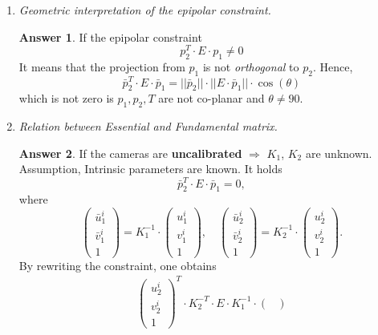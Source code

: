 \documentclass[a4paper,12 pt]{article}
\theoremstyle{definition}
\theoremstyle{remark}
\theoremstyle{definition}
\theoremstyle{definition}
\theoremstyle{definition}
\theoremstyle{definition}
\theoremstyle{remark}
\theoremstyle{remark}
\theoremstyle{definition}
\theoremstyle{definition}
\newtheorem*{answer}{Answer}
\begin{document}
\begin{enumerate}
\item \textit{Geometric interpretation of the epipolar constraint.}
\begin{answer}
If the epipolar constraint
\begin{equation}
p_2^T \cdot E \cdot p_1\neq 0 
\end{equation}
It means that the projection from $p_1$ is not \textit{orthogonal} to $p_2  $. Hence,
\begin{equation}
\bar{p}_2^T\cdot E \cdot \bar{p}_1 = ||\bar{p}_2||\cdot ||E\cdot \bar{p}_1||\cdot \cos(\theta)
\end{equation}
which is not zero is $p_1,p_2,T$ are not co-planar and $\theta\neq 90$. 
\end{answer}
\item \textit{Relation between Essential and Fundamental matrix. }
\begin{answer}
If the cameras are \textbf{uncalibrated} $\Rightarrow$ $K_1$, $K_2$ are unknown.\\
Assumption, Intrinsic parameters are known. It holds 
\begin{equation}
\bar{p}_2^T\cdot E \cdot \bar{p}_1=0,
\end{equation}
where 
\begin{equation}
\begin{pmatrix}
\bar{u}_1^i\\
\bar{v}_1^i\\
1
\end{pmatrix}=K_1^{-1}\cdot \begin{pmatrix}
u_1^i\\
v_1^i\\
1
\end{pmatrix},\quad \begin{pmatrix}
\bar{u}_2^i\\
\bar{v}_2^i\\
1
\end{pmatrix}=K_2^{-1}\cdot \begin{pmatrix}
u_2^i\\
v_2^i\\
1
\end{pmatrix}.
\end{equation}
By rewriting the constraint, one obtains
\begin{equation}
\begin{split}
\begin{pmatrix}
u_2^i\\
v_2^i\\
1
\end{pmatrix}^T\cdot K_2^{-T}\cdot E \cdot K_1^{-1}\cdot \begin{pmatrix}

\end{pmatrix}
\end{split}
\end{equation}
\end{answer}
\end{enumerate}
\end{document}

